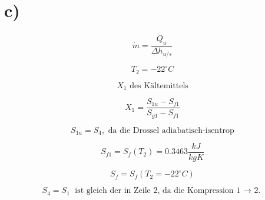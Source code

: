 

\section*{c)}

\[
\dot{m} = \frac{\dot{Q}_u}{\Delta h_{u/s}}
\]

\[
T_2 = -22^\circ C
\]

\[
X_1 \text{ des Kältemittels}
\]

\[
X_1 = \frac{S_{1u} - S_{f1}}{S_{g1} - S_{f1}}
\]

\[
S_{1u} = S_{4}, \text{ da die Drossel adiabatisch-isentrop}
\]

\[
S_{f1} = S_{f} (T_2) = 0.3463 \frac{kJ}{kgK}
\]

\[
S_{f} = S_{f} (T_2 = -22^\circ C)
\]

\[
S_{4} = S_{1} \text{ ist gleich der in Zeile 2, da die Kompression 1 $\rightarrow$ 2.}
\]